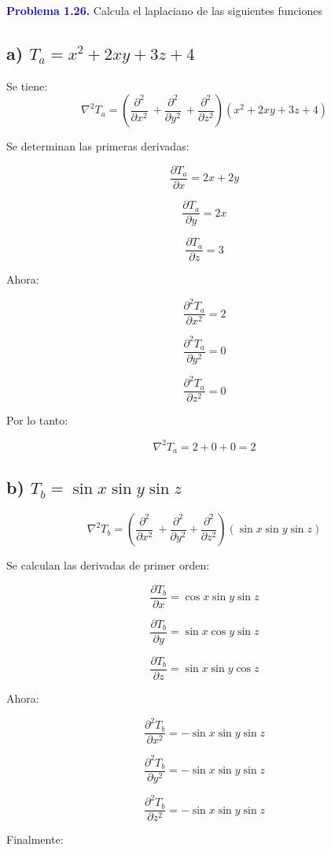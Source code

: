 \documentclass{article}
\newcommand{\question}[1]{\textcolor{blue}{\textbf{#1}}}
\begin{document}
\question{Problema 1.26.} Calcula el laplaciano de las siguientes funciones

\subsection*{a) \( T_a = x^2 + 2xy + 3z + 4 \)}

Se tiene:
\[
\nabla^2 T_a = \left( \frac{\partial^2}{\partial x^2}\ + \frac{\partial^2}{\partial y^2}\ + \frac{\partial^2}{\partial z^2}  \right) (x^2 + 2xy + 3z + 4)
\]

Se determinan las primeras derivadas:

\[
\frac{\partial T_a}{\partial x} = 2x + 2y
\]

\[
\frac{\partial T_a}{\partial y} = 2x
\]

\[
\frac{\partial T_a}{\partial z} = 3
\]

Ahora:

\[
\frac{\partial^2 T_a}{\partial x^2} = 2
\]

\[
\frac{\partial^2 T_a}{\partial y^2} = 0
\]

\[
\frac{\partial^2 T_a}{\partial z^2} = 0
\]

Por lo tanto:

\[
\boxed{\nabla^2 T_a = 2 + 0 + 0 = 2}
\]

\subsection*{b) \( T_b = \sin x \sin y \sin z \)}

\[
\nabla^2 T_b = \left( \frac{\partial^2}{\partial x^2}\ + \frac{\partial^2}{\partial y^2}+ \frac{\partial^2}{\partial z^2}  \right) ( \sin x \sin y \sin z )
\]

Se calculan las derivadas de primer orden:

\[
\frac{\partial T_b}{\partial x} = \cos x \sin y \sin z
\]

\[
\frac{\partial T_b}{\partial y} = \sin x \cos y \sin z
\]

\[
\frac{\partial T_b}{\partial z} = \sin x \sin y \cos z
\]

Ahora:

\[
\frac{\partial^2 T_b}{\partial x^2} = -\sin x \sin y \sin z
\]

\[
\frac{\partial^2 T_b}{\partial y^2} = -\sin x \sin y \sin z
\]

\[
\frac{\partial^2 T_b}{\partial z^2} = -\sin x \sin y \sin z
\]

Finalmente:
\end{document}
